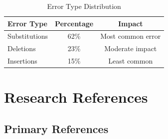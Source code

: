 \documentclass[12pt,a4paper]{article}
\begin{document}
\begin{table}[h]
\centering
\caption{Error Type Distribution}
\begin{tabular}{@{}lcc@{}}
\toprule
\textbf{Error Type} & \textbf{Percentage} & \textbf{Impact} \\
\midrule
Substitutions & 62\% & Most common error \\
Deletions & 23\% & Moderate impact \\
Insertions & 15\% & Least common \\
\bottomrule
\end{tabular}
\end{table}

\section{Research References}

\subsection{Primary References}
\end{document}
